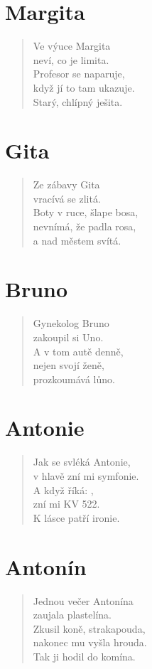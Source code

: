 \section*{Margita}
\begin{verse}
Ve výuce Margita\\
neví, co je limita.\\
Profesor se naparuje,\\
když jí to tam ukazuje.\\
Starý, chlípný ješita.	
\end{verse}

\section*{Gita}
\begin{verse}
Ze zábavy Gita\\
vracívá se zlitá.\\
Boty v ruce, šlape bosa,\\
nevnímá, že padla rosa,\\
a nad městem svítá.	
\end{verse}

\section*{Bruno}
\begin{verse}
Gynekolog Bruno\\
zakoupil si Uno.\\
A v tom autě denně,\\
nejen svojí ženě,\\
prozkoumává lůno.	
\end{verse}

\section*{Antonie}
\begin{verse}
Jak se svléká Antonie,\\
v hlavě zní mi symfonie.\\
A když říká: ,\\
zní mi KV 522.\\
K lásce patří ironie.	
\end{verse}

\section*{Antonín}
\begin{verse}
Jednou večer Antonína\\
zaujala plastelína.\\
Zkusil koně, strakapouda,\\
nakonec mu vyšla hrouda.\\
Tak ji hodil do komína.	
\end{verse}

